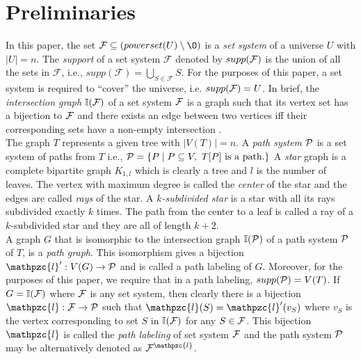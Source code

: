 \documentclass{fsttcs}
\def\cF{{\cal F}}
\def\cP{{\cal P}}
\def\F{{\mathcal F}}
\def\bI{\mathbb I}
\def\cl{\mathpzc{l}}
\begin{document}

\section{Preliminaries} \label{sec:prelims} 
\noindent
In this paper, the set $\F \subseteq (powerset(U) \setminus \O)$ is a
{\em set system} of a universe $U$ with $|U| = n$. 
The {\em support} of a set system $\F$ denoted by  $supp(\cF)$ is the
union of all the sets in $\F$, i.e., $supp(\F) =
\bigcup_{S \in \F}S$.
For the purposes of this paper, a set system is required to ``cover'' the universe,
i.e. $ supp(\cF) = U$. In brief, the {\em intersection graph} $\bI(\cF)$ of a
set system $\cF$ is a graph such that its vertex set has a bijection
to $\cF$ and there exists an edge between two vertices iff their
corresponding sets have a non-empty
intersection \cite{mcg04}. \\
\noindent
The graph $T$ represents a given tree with $|V(T)| = n$. 
A {\em path system} $\cP$ is a set system of paths from
$T$ i.e., $\cP = \{P \mid P \subseteq V, \text{ } T[P]
\text{ is a path.} \}$
\noindent
A {\em star} graph is a complete bipartite graph
$K_{1,l}$ which is clearly a tree and $l$ is the number of leaves. The vertex with maximum degree is called the {\em center} of
the star and the edges are called {\em rays} of the star.
A {\em $k$-subdivided star} is a star with all its rays subdivided exactly
$k$ times. The path from the center to a leaf is called a ray of a
$k$-subdivided star and they are all of length $k+2$.\\
\noindent
A graph $G$ that is isomorphic to the intersection graph $\bI(\cP)$ of a
path system $\cP$ of $T$, is a {\em path graph}. This
isomorphism gives a bijection $\cl': V(G) \rightarrow \cP$ and is
called a path labeling of $G$. Moreover, for the purposes of this paper, we
require that in a path labeling, $supp(\cP) = V(T)$. 
If $G = \bI(\cF)$ where $\cF$ is any set system, then clearly there is
a bijection $\cl: \cF \rightarrow \cP$ such that $\cl(S) = \cl'(v_S)$
where $v_S$ is the vertex corresponding to set $S$ in $\bI(\cF)$ for
any $S \in \cF$. 
This bijection $\cl$ is called the {\em path labeling} of set system
$\cF$ and the path system $\cP$ may be alternatively denoted as
$\cF^\cl$. 
 
\end{document}
